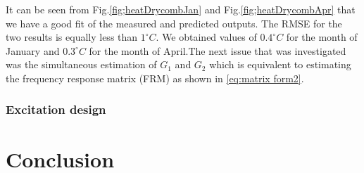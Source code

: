 \documentclass[a4paper,12pt]{article}
\numberwithin{equation}{section}
\begin{document}
It can be seen from Fig.\ref{fig;heatDrycombJan} and Fig.\ref{fig;heatDrycombApr} that we have a good fit of the measured and predicted outputs. The RMSE for the two results is equally less than $1^{\circ} C$. We obtained values of $0.4^{\circ} C$ for the month of January and $0.3^{\circ} C$
for the month of April.The next issue that was investigated was the simultaneous estimation of $G_{1}$ and $G_{2}$ which is equivalent to estimating the frequency response matrix (FRM) as shown in \ref{eq:matrix form2}.

\subsubsection{Excitation design}




\newpage
\section{Conclusion}
\end{document}
